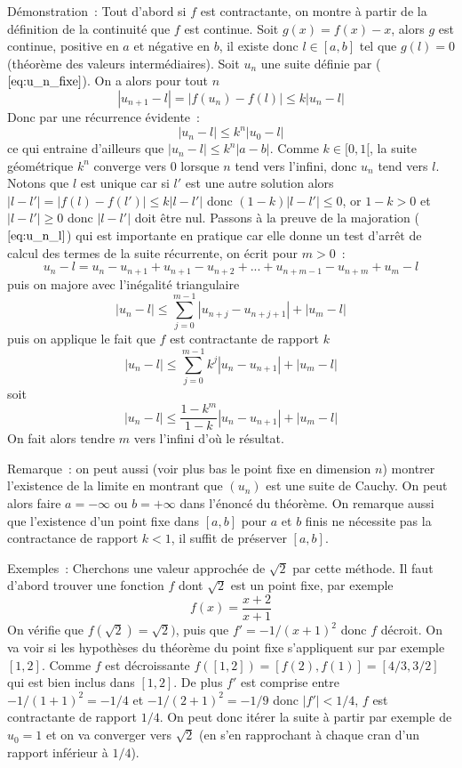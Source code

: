 \documentclass[a4paper,11pt]{article}
\begin{document}
\begin{giacjshere}
Démonstration~: Tout d'abord si $f$ est contractante, on montre à partir
de la définition de la continuité que $f$ est continue. 
Soit $g(x)=f(x)-x$, alors $g$ est continue, positive en $a$ et négative
en $b$, il existe donc $l\in[a,b]$ tel que $g(l)=0$ (théorème des
valeurs intermédiaires). 
Soit $u_n$ une suite définie par
(\(\ref{eq:u_n_fixe}\)). On a alors pour tout $n$
\[ |u_{n+1}-l|=|f(u_n)-f(l)| \leq k |u_n-l| \]
Donc par une récurrence évidente~:
\[ |u_n-l| \leq k^n |u_0-l| \]
ce qui entraine d'ailleurs que $|u_n-l| \leq k^n |a-b|$.
Comme $k \in [0,1[ $, la suite géométrique $k^n$ converge vers 0
lorsque $n$ tend vers l'infini, donc $u_n$ tend vers $l$.
Notons que $l$ est unique car si $l'$ est une autre solution
alors $|l-l'|=|f(l)-f(l')| \leq k|l-l'|$ donc $(1-k)|l-l'| \leq 0$,
or $1-k>0$ et $|l-l'| \geq 0$ donc $|l-l'|$ doit \^etre nul.
Passons à la preuve de la majoration (\(\ref{eq:u_n_l}\)) qui est importante
en pratique car elle donne un test d'arrêt de calcul des
termes de la suite récurrente, on écrit pour $m>0$~:
\[ u_n-l= u_n - u_{n+1} + u_{n+1} - u_{n+2} + ... + u_{n+m-1}- u_{n+m}
+ u_m-l \]
puis on majore avec l'inégalité triangulaire
\[ |u_n-l| \leq \sum_{j=0}^{m-1} |u_{n+j}-u_{n+j+1}| + |u_m-l| \]
puis on applique le fait que $f$ est contractante de rapport $k$
\[ |u_n-l| \leq \sum_{j=0}^{m-1} k^j |u_{n}-u_{n+1}| + |u_m-l| \]
soit
\[ |u_n-l| \leq \frac{1-k^m}{1-k} |u_{n}-u_{n+1}| + |u_m-l| \]
On fait alors tendre $m$ vers l'infini d'où le résultat.

Remarque~: on peut aussi (voir plus bas le point fixe en dimension
$n$) montrer l'existence de la limite en montrant que $(u_n)$ est
une suite de Cauchy. On peut alors faire $a=-\infty$ ou $b=+\infty$
dans l'\'enonc\'e du th\'eor\`eme. On remarque aussi 
que l'existence d'un point fixe
dans $[a,b]$ pour $a$ et $b$ finis ne n\'ecessite pas la contractance
de rapport $k<1$, il suffit de pr\'eserver $[a,b]$.

Exemples~: 
Cherchons une valeur approchée de $\sqrt{2}$ par cette méthode.
Il faut d'abord trouver une fonction $f$ dont $\sqrt{2}$ est un point
fixe, par exemple
\[ f(x)=\frac{x+2}{x+1}\]
On vérifie que $f(\sqrt{2})=\sqrt{2})$, puis que $f'=-1/(x+1)^2$
donc $f$ décroit. On va voir si les hypothèses du théorème du point
fixe s'appliquent sur par exemple $[1,2]$. Comme $f$ est décroissante
$f([1,2])=[f(2),f(1)]=[4/3,3/2]$ qui est bien inclus dans $[1,2] $.
De plus $f'$ est comprise entre $-1/(1+1)^2=-1/4$ et $-1/(2+1)^2=-1/9$ donc
$|f'|<1/4$, $f$ est contractante de rapport $1/4$. On peut donc
itérer la suite à partir par exemple de $u_0=1$ et on va converger
vers $\sqrt{2}$ (en s'en rapprochant à chaque cran d'un rapport
inférieur à $1/4$).


\end{giacjshere}
\end{document}
